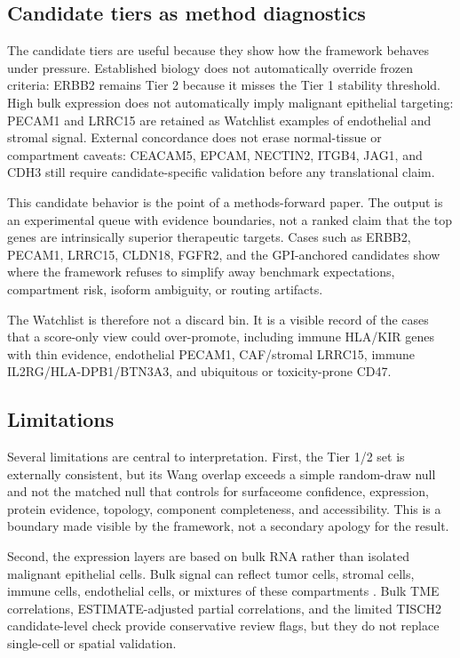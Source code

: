 \documentclass[review,12pt,authoryear]{elsarticle}
\begin{document}
\subsection{Candidate tiers as method diagnostics}

The candidate tiers are useful because they show how the framework behaves under pressure. Established biology does not automatically override frozen criteria: ERBB2 remains Tier 2 because it misses the Tier 1 stability threshold. High bulk expression does not automatically imply malignant epithelial targeting: PECAM1 and LRRC15 are retained as Watchlist examples of endothelial and stromal signal. External concordance does not erase normal-tissue or compartment caveats: CEACAM5, EPCAM, NECTIN2, ITGB4, JAG1, and CDH3 still require candidate-specific validation before any translational claim.

This candidate behavior is the point of a methods-forward paper. The output is an experimental queue with evidence boundaries, not a ranked claim that the top genes are intrinsically superior therapeutic targets. Cases such as ERBB2, PECAM1, LRRC15, CLDN18, FGFR2, and the GPI-anchored candidates show where the framework refuses to simplify away benchmark expectations, compartment risk, isoform ambiguity, or routing artifacts.

The Watchlist is therefore not a discard bin. It is a visible record of the cases that a score-only view could over-promote, including immune HLA/\allowbreak{}KIR genes with thin evidence, endothelial PECAM1, CAF/\allowbreak{}stromal LRRC15, immune IL2RG/\allowbreak{}HLA-DPB1/\allowbreak{}BTN3A3, and ubiquitous or toxicity-prone CD47.

\subsection{Limitations}

Several limitations are central to interpretation. First, the Tier 1/\allowbreak{}2 set is externally consistent, but its Wang overlap exceeds a simple random-draw null and not the matched null that controls for surfaceome confidence, expression, protein evidence, topology, component completeness, and accessibility. This is a boundary made visible by the framework, not a secondary apology for the result.

Second, the expression layers are based on bulk RNA rather than isolated malignant epithelial cells. Bulk signal can reflect tumor cells, stromal cells, immune cells, endothelial cells, or mixtures of these compartments \citep{yoshihara2013estimate,han2023tisch2,zhang2019gastric_scrna,jeong2021gastric_tme}. Bulk TME correlations, ESTIMATE-adjusted partial correlations, and the limited TISCH2 candidate-level check provide conservative review flags, but they do not replace single-cell or spatial validation.
\end{document}
